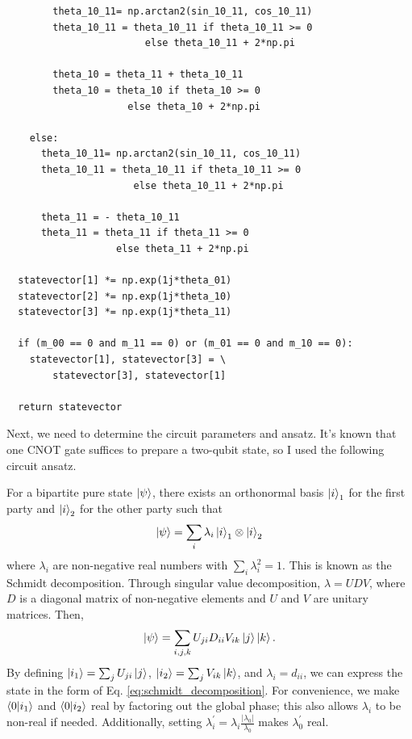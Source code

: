 \documentclass[a4paper, 11pt]{article}
\begin{document}
\begin{verbatim}
        theta_10_11= np.arctan2(sin_10_11, cos_10_11)
        theta_10_11 = theta_10_11 if theta_10_11 >= 0 
                        else theta_10_11 + 2*np.pi
        
        theta_10 = theta_11 + theta_10_11
        theta_10 = theta_10 if theta_10 >= 0 
                     else theta_10 + 2*np.pi
    
    else:
      theta_10_11= np.arctan2(sin_10_11, cos_10_11)
      theta_10_11 = theta_10_11 if theta_10_11 >= 0 
                      else theta_10_11 + 2*np.pi
      
      theta_11 = - theta_10_11
      theta_11 = theta_11 if theta_11 >= 0 
                   else theta_11 + 2*np.pi
    
  statevector[1] *= np.exp(1j*theta_01)
  statevector[2] *= np.exp(1j*theta_10)
  statevector[3] *= np.exp(1j*theta_11)
    
  if (m_00 == 0 and m_11 == 0) or (m_01 == 0 and m_10 == 0):
    statevector[1], statevector[3] = \
        statevector[3], statevector[1]

  return statevector    
\end{verbatim}

Next, we need to determine the circuit parameters and ansatz. 
It's known that one CNOT gate suffices to prepare a two-qubit state, so I used the following circuit ansatz.

For a bipartite pure state $\ket{\psi}$, there exists an orthonormal basis $\ket{i}_1$ for the first party and $\ket{i}_2$ for the other party such that
\begin{equation}
  \ket{\psi} = \sum_{i}\lambda_{i} \ket{i}_1\otimes\ket{i}_2
  \label{eq:schmidt_decomposition}
\end{equation}
where $\lambda_i$ are non-negative real numbers with $\sum_i \lambda_i^2 = 1$. This is known as the Schmidt decomposition. 
Through singular value decomposition, $\lambda = UDV$, where $D$ is a diagonal matrix of non-negative elements and $U$ and $V$ are unitary matrices.
Then,
\begin{equation}
  \ket{\psi} = \sum_{i,j,k} U_{ji}D_{ii}V_{ik} \ket{j}\ket{k}.
\end{equation}
By defining $\ket{i_1} = \sum_{j}U_{ji}\ket{j}$, $\ket{i_2} = \sum_{j}V_{ik}\ket{k}$, and $\lambda_{i} = d_{ii}$, we can express the state in the form of Eq. \ref{eq:schmidt_decomposition}.
For convenience, we make $\bra{0}\ket{i_1}$ and $\bra{0}\ket{i_2}$  real by factoring out the global phase;
this also allows $\lambda_{i}$ to be non-real if needed. Additionally, setting $\lambda_{i}^{\prime} = \lambda_{i} \frac{|\lambda_{0}|}{\lambda_{0}}$ makes $\lambda^{\prime}_{0}$ real.
\end{document}
